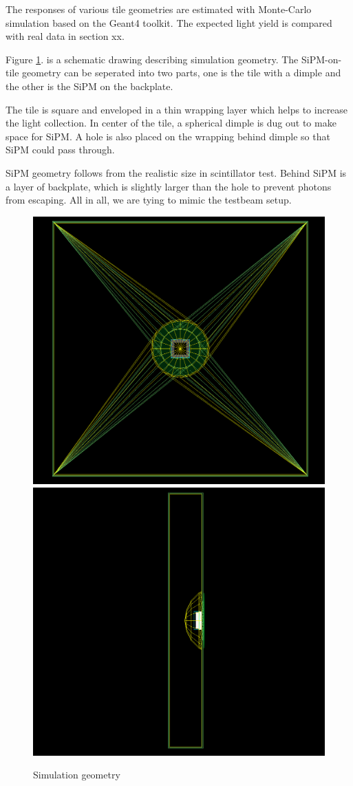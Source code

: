 \documentclass[a4paper,11pt]{article}
\begin{document}
The responses of various tile geometries are estimated with Monte-Carlo simulation based on the Geant4 toolkit\cite{geant4}.
The expected light yield is compared with real data in section xx.

Figure \ref{fig:g4simu}. is a schematic drawing describing simulation geometry. 
The SiPM-on-tile geometry can be seperated into two parts, 
one is the tile with a dimple and the other is the SiPM on the backplate. 

The tile is square and enveloped in a thin wrapping layer which helps to increase the light collection.
In center of the tile, a spherical dimple is dug out to make space for SiPM.
A hole is also placed on the wrapping behind dimple so that SiPM could pass through.

SiPM geometry follows from the realistic size in scintillator test.
Behind SiPM is a layer of backplate, which is slightly larger than the hole to prevent photons from escaping.
All in all, we are tying to mimic the testbeam setup. 

\begin{figure}[htbp]
\centering %
\includegraphics[width=.45\textwidth]{front.png}
\includegraphics[width=.45\textwidth]{side.png}
\caption{\label{fig:g4simu} Simulation geometry}
\end{figure}
\end{document}
